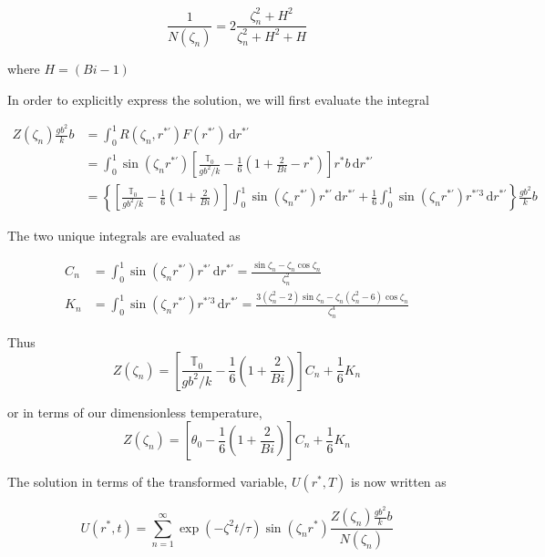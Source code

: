 \begin{equation}
    \frac{1}{N(\zeta_n)} = 2\frac{\zeta_n^2 + H^2}{\zeta_n^2+H^2 + H}
\end{equation}

where $H = (Bi-1)$

In order to explicitly express the solution, we will first evaluate the integral

\begin{align}
    Z(\zeta_n)\frac{gb^2}{k}b & = \int_0^1 R(\zeta_n,r^{*'})F(r^{*'})\,\mathrm{d}r^{*'} \\
    & = \int_0^1\sin(\zeta_nr^{*'}) \left[\frac{\mathbb{T}_0}{gb^2/k} - \frac{1}{6}\left(1 + \frac{2}{Bi} - r^*\right)\right]r^*b \,\mathrm{d}r^{*'}\\
    & =\left\{ \left[\frac{\mathbb{T}_0}{gb^2/k}  - \frac{1}{6}\left(1 + \frac{2}{Bi}\right)\right]\int_0^1\sin(\zeta_nr^{*'})r^{*'} \,\mathrm{d}r^{*'} + \frac{1}{6}\int_0^1 \sin(\zeta_nr^{*'})r^{*'3} \,\mathrm{d}r^{*'}\right\}\frac{gb^2}{k}b
\end{align}

The two unique integrals are evaluated as

\begin{align}
    C_n &= \int_0^1\sin(\zeta_nr^{*'})r^{*'} \,\mathrm{d}r^{*'}  = \frac{\sin\zeta_n-\zeta_n\cos\zeta_n}{\zeta_n^2}\\
    K_n &= \int_0^1\sin(\zeta_nr^{*'})r^{*'3} \,\mathrm{d}r^{*'}  = \frac{3(\zeta_n^2-2)\sin\zeta_n - \zeta_n(\zeta_n^2-6)\cos\zeta_n}{\zeta_n^4}
\end{align}

Thus
\begin{equation}
    Z(\zeta_n) = \left[\frac{\mathbb{T}_0}{gb^2/k} - \frac{1}{6}\left(1 + \frac{2}{Bi}\right)\right]C_n + \frac{1}{6}K_n
\end{equation}

or in terms of our dimensionless temperature,
\begin{equation}
    Z(\zeta_n) = \left[\theta_0 - \frac{1}{6}\left(1 + \frac{2}{Bi}\right)\right]C_n + \frac{1}{6}K_n
\end{equation}

The solution in terms of the transformed variable, $U(r^*,T)$ is now written as

\begin{equation}
    U(r^*,t) = \sum_{n=1}^\infty \exp(-\zeta^2 t/\tau) \sin(\zeta_n r^*)\frac{Z(\zeta_n)\frac{gb^2}{k}b}{N(\zeta_n)}
\end{equation}


